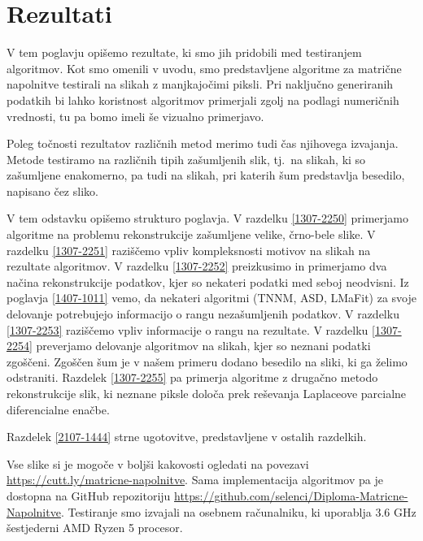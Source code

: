 \chapter{Rezultati}\label{1407-1012}

V tem poglavju opišemo rezultate, ki smo jih pridobili med testiranjem algoritmov. Kot smo omenili v uvodu, smo predstavljene algoritme za matrične napolnitve testirali na slikah z manjkajočimi piksli. 
Pri naključno generiranih podatkih bi lahko koristnost algoritmov primerjali zgolj na podlagi numeričnih vrednosti, tu pa bomo imeli še vizualno primerjavo.

Poleg točnosti rezultatov različnih metod merimo tudi čas njihovega izvajanja. Metode testiramo na različnih tipih zašumljenih slik, tj.\ na slikah, ki so zašumljene enakomerno, pa tudi na slikah, pri katerih šum predstavlja besedilo, napisano čez sliko.

V tem odstavku opišemo strukturo poglavja.
V razdelku \ref{1307-2250} primerjamo algoritme na problemu rekonstrukcije zašumljene velike, črno-bele slike. V razdelku \ref{1307-2251} raziščemo vpliv kompleksnosti motivov na slikah na rezultate algoritmov. V razdelku \ref{1307-2252} preizkusimo in primerjamo dva načina rekonstrukcije podatkov, kjer so nekateri podatki med seboj neodvisni. Iz poglavja \ref{1407-1011} vemo, da nekateri algoritmi (TNNM, ASD, LMaFit) za svoje delovanje potrebujejo informacijo o rangu nezašumljenih podatkov. V razdelku \ref{1307-2253} raziščemo vpliv informacije o rangu na rezultate. V razdelku \ref{1307-2254} preverjamo delovanje algoritmov na slikah, kjer so neznani podatki zgoščeni.
Zgoščen šum je v našem primeru dodano besedilo na sliki, ki ga želimo odstraniti. Razdelek \ref{1307-2255} pa primerja algoritme z drugačno metodo rekonstrukcije slik, ki neznane piksle določa prek reševanja Laplaceove parcialne diferencialne enačbe. 

Razdelek \ref{2107-1444} strne ugotovitve, predstavljene v ostalih razdelkih.


Vse slike si je mogoče v boljši kakovosti ogledati na povezavi \url{https://cutt.ly/matricne-napolnitve}. Sama implementacija algoritmov pa je dostopna na GitHub repozitoriju \url{https://github.com/selenci/Diploma-Matricne-Napolnitve}.
Testiranje smo izvajali na osebnem računalniku, ki uporablja 3.6 GHz šestjederni AMD Ryzen 5 procesor.

